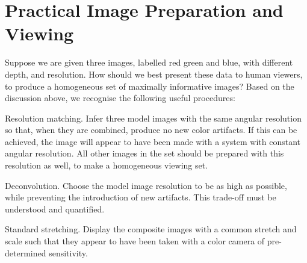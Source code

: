 \documentclass[letterpaper, 11pt]{article}
\begin{document}

\section{Practical Image Preparation and Viewing}

Suppose we are given three images, labelled red green and blue, with different
depth, and resolution. How should we best present these data to human viewers,
to produce a homogeneous set of  maximally informative images? Based on the
discussion above, we recognise the following useful procedures:

\begin{description}

\item{Resolution matching}. Infer three model images with the same angular
resolution so that,  when they are combined, produce no new color artifacts.
If this can be achieved, the image will appear to have been made with a system
with constant angular resolution. All other images in the set should be
prepared with this resolution as well, to make a homogeneous viewing set.

\item{Deconvolution.} Choose the model image resolution to be as high as
possible, while preventing the introduction of new artifacts. This trade-off
must be understood and quantified. 

\item{Standard stretching.} Display the composite images with a common stretch
and scale such that they appear to have been taken with a color camera of
pre-determined sensitivity.

\end{description}


\end{document}
